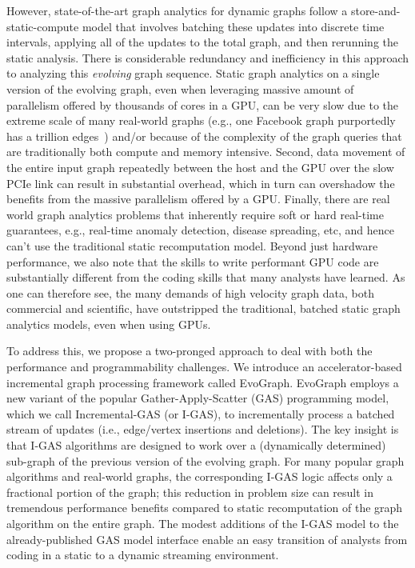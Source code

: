 However, state-of-the-art graph analytics for dynamic graphs follow a store-and-static-compute model that involves batching these updates into discrete time intervals, applying all of the updates to the total graph, and then rerunning the static analysis.  There is considerable redundancy and inefficiency in this approach to analyzing this \textit{evolving} graph sequence.  Static graph analytics on a single version of the evolving graph, even when leveraging massive amount of parallelism offered by thousands of cores in a GPU, can be very slow due to the extreme scale of many real-world graphs (e.g., one Facebook graph purportedly has a trillion edges~\cite{fb}) and/or because of the complexity of the graph queries that are traditionally both compute and memory intensive. Second, data movement of the entire input graph repeatedly between the host and the GPU over the slow PCIe link can result in substantial overhead, which in turn can overshadow the benefits from the massive parallelism offered by a GPU.  Finally, there are real world graph analytics problems that inherently require soft or hard real-time guarantees, e.g., real-time anomaly detection, disease spreading, etc, and hence can't use the traditional static recomputation model. Beyond just hardware performance, we also note that the skills to write performant GPU code are substantially different from the coding skills that many analysts have learned.  As one can therefore see, the many demands of high velocity graph data, both commercial and scientific, have outstripped the traditional, batched static graph analytics models, even when using GPUs.

To address this, we propose a two-pronged approach to deal with both the performance and programmability challenges. We introduce an accelerator-based incremental graph processing framework called EvoGraph. EvoGraph employs a new variant of  the popular Gather-Apply-Scatter (GAS) programming model, which we call Incremental-GAS (or I-GAS), to incrementally process a batched stream of updates (i.e., edge/vertex insertions and deletions).  The key insight is that I-GAS algorithms are designed to work over a (dynamically determined) sub-graph of the previous version of the evolving graph.  For many popular graph algorithms and real-world graphs, the corresponding I-GAS logic affects only a fractional portion of the graph; this reduction in problem size can result in tremendous performance benefits compared to static recomputation of the graph algorithm on the entire graph.  The modest additions of the I-GAS model to the already-published GAS model interface enable an easy transition of analysts from coding in a static to a dynamic streaming environment.


